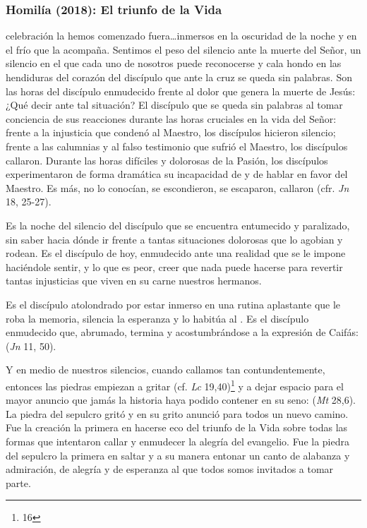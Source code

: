 \newpage 

\subsubsection{Homilía (2018): El triunfo de la Vida} 


\begin{body}
 celebración la hemos comenzado fuera\ldots inmersos en la oscuridad de la noche y en el frío que la acompaña. Sentimos el peso del silencio ante la muerte del Señor, un silencio en el que cada uno de nosotros puede reconocerse y cala hondo en las hendiduras del corazón del discípulo que ante la cruz se queda sin palabras. Son las horas del discípulo enmudecido frente al dolor que genera la muerte de Jesús: ¿Qué decir ante tal situación? El discípulo que se queda sin palabras al tomar conciencia de sus reacciones durante las horas cruciales en la vida del Señor: frente a la injusticia que condenó al Maestro, los discípulos hicieron silencio; frente a las calumnias y al falso testimonio que sufrió el Maestro, los discípulos callaron. Durante las horas difíciles y dolorosas de la Pasión, los discípulos experimentaron de forma dramática su incapacidad de  y de hablar en favor del Maestro. Es más, no lo conocían, se escondieron, se escaparon, callaron (cfr. \textit{Jn} 18, 25-27). 

Es la noche del silencio del discípulo que se encuentra entumecido y paralizado, sin saber hacia dónde ir frente a tantas situaciones dolorosas que lo agobian y rodean. Es el discípulo de hoy, enmudecido ante una realidad que se le impone haciéndole sentir, y lo que es peor, creer que nada puede hacerse para revertir tantas injusticias que viven en su carne nuestros hermanos. 

Es el discípulo atolondrado por estar inmerso en una rutina aplastante que le roba la memoria, silencia la esperanza y lo habitúa al . Es el discípulo enmudecido que, abrumado, termina  y acostumbrándose a la expresión de Caifás:  (\textit{Jn} 11, 50). 

Y en medio de nuestros silencios, cuando callamos tan contundentemente, entonces las piedras empiezan a gritar (cf. \textit{Lc} 19,40)\footnote{16} y a dejar espacio para el mayor anuncio que jamás la historia haya podido contener en su seno:  (\textit{Mt} 28,6). La piedra del sepulcro gritó y en su grito anunció para todos un nuevo camino. Fue la creación la primera en hacerse eco del triunfo de la Vida sobre todas las formas que intentaron callar y enmudecer la alegría del evangelio. Fue la piedra del sepulcro la primera en saltar y a su manera entonar un canto de alabanza y admiración, de alegría y de esperanza al que todos somos invitados a tomar parte. 


\end{body}
